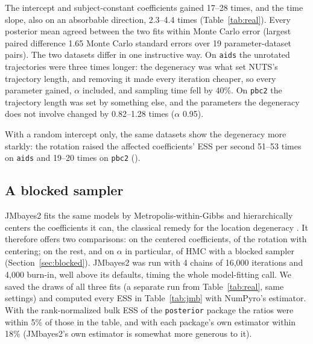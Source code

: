 The intercept and subject-constant coefficients gained 17--28 times, and the time slope, also on an absorbable direction, 2.3--4.4 times (Table~\ref{tab:real}). Every posterior mean agreed
between the two fits within Monte Carlo error (largest paired difference
1.65 Monte Carlo standard errors over 19 parameter-dataset pairs). The two
datasets differ in one instructive way. On \texttt{aids} the unrotated
trajectories were three times longer: the degeneracy was what set NUTS's
trajectory length, and removing it made every iteration cheaper, so every
parameter gained, $\alpha$ included, and sampling time fell by 40\%. On
\texttt{pbc2} the trajectory length was set by something else, and the
parameters the degeneracy does not involve changed by 0.82--1.28 times ($\alpha$ 0.95).

With a random intercept only, the same datasets show the degeneracy more
starkly: the rotation raised the affected coefficients' ESS per second
51--53 times on \texttt{aids} and 19--20 times on \texttt{pbc2}
().

\subsection{A blocked sampler}

JMbayes2 \citep{jmbayes2} fits the same models by Metropolis-within-Gibbs
and hierarchically centers the coefficients it can, the classical remedy
for the location degeneracy \citep{gelfand1995}. It therefore offers two
comparisons: on the centered coefficients, of the rotation with
centering; on the rest, and on $\alpha$ in particular, of HMC with a
blocked sampler
(Section~\ref{sec:blocked}). JMbayes2 was run with 4 chains of 16,000
iterations and 4,000 burn-in, well above its defaults, timing the whole
model-fitting call. We saved the draws of all three fits (a separate run
from Table~\ref{tab:real}, same settings) and computed every ESS in
Table~\ref{tab:jmb} with NumPyro's estimator. With the rank-normalized
bulk ESS of the \texttt{posterior} package the ratios were within 5\% of
those in the table, and with each package's own estimator within 18\%
(JMbayes2's own estimator is somewhat more generous to it).

